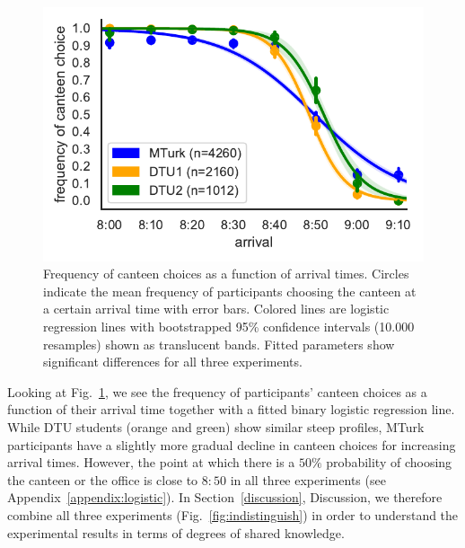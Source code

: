 \documentclass[twocolumn,a4paper,superscriptaddress,nofootinbib]{revtex4}
\begin{document}
\begin{figure} %
\centering\includegraphics[width=0.6\linewidth]{fig1_logit}
\caption{Frequency of canteen choices as a function of arrival times. Circles indicate the mean frequency of participants choosing the canteen at a certain arrival time with error bars. Colored lines are logistic regression lines with bootstrapped 95\% confidence intervals (10.000 resamples) shown as translucent bands. Fitted parameters show significant differences for all three experiments.}
\label{fig:1}
\end{figure}
Looking at Fig.~\ref{fig:1}, we see the frequency of participants' canteen choices as a function of their arrival time together with a fitted binary logistic regression line. While DTU students (orange and green) show similar steep profiles, MTurk participants have a slightly more gradual decline in canteen choices for increasing arrival times. However, the point at which there is a $50\%$ probability of choosing the canteen or the office is close to $8{:}50$ in all three experiments (see Appendix~\ref{appendix:logistic}). In Section~\ref{discussion}, Discussion, we therefore combine all three experiments (Fig.~\ref{fig:indistinguish}) in order to understand the experimental results in terms of degrees of shared knowledge.
\end{document}
